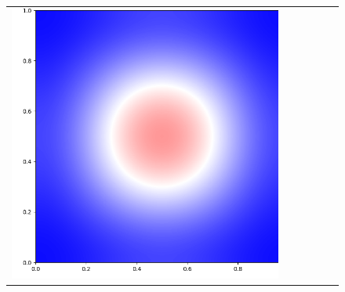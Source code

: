 \documentclass[12pt, reqno]{report}
\theoremstyle{definition}
\theoremstyle{remark}
\begin{document}
\begin{figure}[H]
\begin{tabular}{rccccc}
        \includegraphics[align = c, height=\subheight]{media_paper/cmap_FD_n=1000.png} \\


\end{tabular}
\end{figure}
\end{document}

